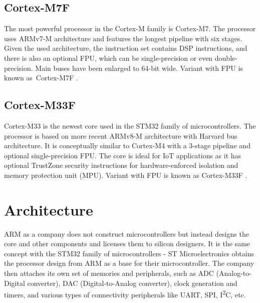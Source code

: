 	\subsection{Cortex-M7F}
	\label{sub:stm_m7}
The most powerful processor in the Cortex-M family is Cortex-M7. The processor uses \mbox{ARMv7-M} architecture and features the longest pipeline with six stages. Given the used architecture, the instruction set contains DSP instructions, and there is also an optional FPU, which can be single-precision or even double-precision. Main buses have been enlarged to 64-bit wide. Variant with FPU is known as~Cortex-M7F \cite{m7_web}. 
	
	\subsection{Cortex-M33F}
	\label{sub:stm_m33}
Cortex-M33 is the newest core used in the STM32 family of microcontrollers. The processor is based on more recent ARMv8-M architecture with Harvard bus architecture. It is conceptually similar to Cortex-M4 with a 3-stage pipeline and optional single-precision FPU. The core is ideal for IoT applications as it has optional TrustZone security instructions for hardware-enforced isolation and memory protection unit (MPU). Variant with FPU is known as Cortex-M33F \cite{m33_web}. 

\section{Architecture}
\label{sec:stm_arch}
ARM as a company does not construct microcontrollers but instead designs the core and other components and licenses them to silicon designers. It is the same concept with the STM32 family of microcontrollers - ST Microelectronics obtains the processor design from ARM as a base for their microcontroller. The company then attaches its own set of memories and peripherals, such as ADC (Analog-to-Digital converter), DAC (Digital-to-Analog converter), clock generation and timers, and various types of connectivity peripherals like UART, SPI, I\textsuperscript{2}C, etc.

